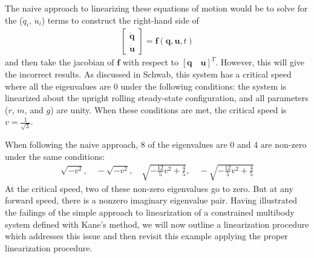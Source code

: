 \documentclass[smallcondensed,final]{svjour3}                     %
\begin{document}
The naive approach to linearizing these equations of motion would be to solve
for the ($\dot{q}_i$, $\dot{u}_i$) terms to construct the right-hand side of
\begin{align}
\begin{bmatrix}\dot{\mathbf{q}} \\ \dot{\mathbf{u}}\end{bmatrix} =
    \mathbf{f}(\mathbf{q}, \mathbf{u}, t)
\end{align}
and then take the jacobian of $\mathbf{f}$ with respect to $[\mathbf{q}
\quad \mathbf{u}]^T$. However, this will give the incorrect results. As
discussed in Schwab, this system has a critical speed where all the eigenvalues
are 0 under the following conditions: the system is linearized about the
upright rolling steady-state configuration, and all parameters ($r$, $m$, and
$g$) are unity. When these conditions are met, the critical speed is
$v=\frac{1}{\sqrt{3}}$.

When following the naive approach, 8 of the eigenvalues are 0 and 4 are
non-zero under the same conditions:
\begin{align}
\sqrt{-v^2},\quad -\sqrt{-v^2},\quad \sqrt{-\frac{12}{5} v^2 +
\frac{4}{5}},\quad -\sqrt{-\frac{12}{5} v^2 + \frac{4}{5}}
\end{align}
At the critical speed, two of these non-zero eigenvalues go to zero. But at any
forward speed, there is a nonzero imaginary eigenvalue pair. Having illustrated
the failings of the simple approach to linearization of a constrained multibody
system defined with Kane's method, we will now outline a linearization
procedure which addresses this issue and then revisit this example applying the
proper linearization procedure.
\end{document}
